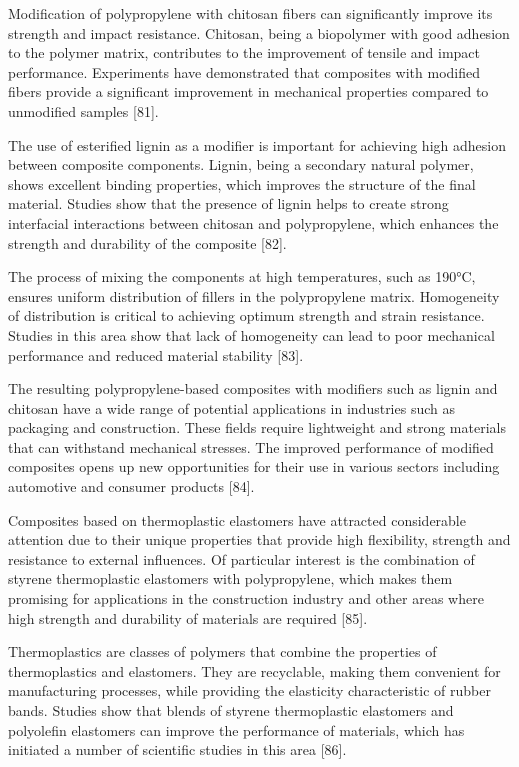 Modification of polypropylene with chitosan fibers can significantly
improve its strength and impact resistance. Chitosan, being a biopolymer
with good adhesion to the polymer matrix, contributes to the improvement
of tensile and impact performance. Experiments have demonstrated that
composites with modified fibers provide a significant improvement in
mechanical properties compared to unmodified samples {[}81{]}.

The use of esterified lignin as a modifier is important for achieving
high adhesion between composite components. Lignin, being a secondary
natural polymer, shows excellent binding properties, which improves the
structure of the final material. Studies show that the presence of
lignin helps to create strong interfacial interactions between chitosan
and polypropylene, which enhances the strength and durability of the
composite {[}82{]}.

The process of mixing the components at high temperatures, such as
190°C, ensures uniform distribution of fillers in the polypropylene
matrix. Homogeneity of distribution is critical to achieving optimum
strength and strain resistance. Studies in this area show that lack of
homogeneity can lead to poor mechanical performance and reduced material
stability {[}83{]}.

The resulting polypropylene-based composites with modifiers such as
lignin and chitosan have a wide range of potential applications in
industries such as packaging and construction. These fields require
lightweight and strong materials that can withstand mechanical stresses.
The improved performance of modified composites opens up new
opportunities for their use in various sectors including automotive and
consumer products {[}84{]}.

Composites based on thermoplastic elastomers have attracted considerable
attention due to their unique properties that provide high flexibility,
strength and resistance to external influences. Of particular interest
is the combination of styrene thermoplastic elastomers with
polypropylene, which makes them promising for applications in the
construction industry and other areas where high strength and durability
of materials are required {[}85{]}.

Thermoplastics are classes of polymers that combine the properties of
thermoplastics and elastomers. They are recyclable, making them
convenient for manufacturing processes, while providing the elasticity
characteristic of rubber bands. Studies show that blends of styrene
thermoplastic elastomers and polyolefin elastomers can improve the
performance of materials, which has initiated a number of scientific
studies in this area {[}86{]}.

